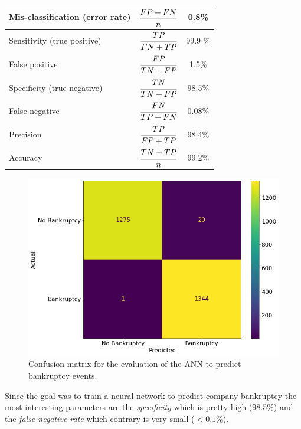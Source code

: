 \makegapedcells\begin{table}[htbp]
\centering
\begin{tabular}{|l|c|c|}
\hline
Mis-classification (error rate) & $\cfrac{FP+FN}{n}$ & 0.8\% \\
\hline
Sensitivity (true positive) & $\cfrac{TP}{FN+TP}$ & 99.9 \% \\
\hline
False positive & $\cfrac{FP}{TN+FP}$ & 1.5\% \\
\hline
Specificity (true negative) & $\cfrac{TN}{TN+FP}$ &  98.5\% \\
\hline
False negative & $\cfrac{FN}{TP+FN}$ & 0.08\% \\
\hline
Precision & $\cfrac{TP}{FP+TP}$ & 98.4\% \\ 
\hline
Accuracy & $\cfrac{TN+TP}{n}$ & 99.2\% \\
\hline
\end{tabular}
\end{table}

\begin{figure}[htbp]
\centering
\includegraphics[width=0.7\linewidth]{figures/confusion_matrix}
\caption{Confusion matrix for the evaluation of the ANN to predict bankruptcy events.}
\label{fig:confusion_matrix}
\end{figure}

Since the goal was to train a neural network to predict company bankruptcy the most interesting parameters are the \emph{specificity} which is pretty high (98.5\%) and the \emph{false negative rate} which contrary is very small ($< 0.1\%$).

